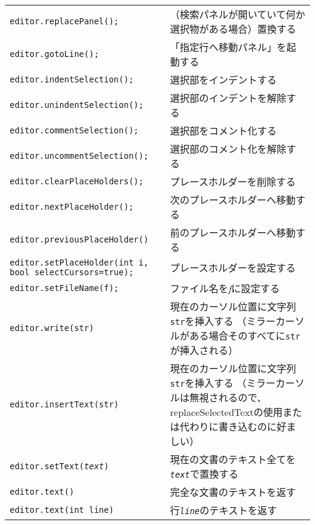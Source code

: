 \begin{longtable}{XX}
  \texttt{editor.replacePanel();} & （検索パネルが開いていて何か選択物がある場合）置換する\\
  \texttt{editor.gotoLine();} & 「指定行へ移動パネル」を起動する\\
  \texttt{editor.indentSelection();} & 選択部をインデントする\\
  \texttt{editor.unindentSelection();} & 選択部のインデントを解除する\\
  \texttt{editor.commentSelection();} & 選択部をコメント化する\\
  \texttt{editor.uncommentSelection();} & 選択部のコメント化を解除する\\
  \texttt{editor.clearPlaceHolders();} & プレースホルダーを削除する\\
  \texttt{editor.nextPlaceHolder();} & 次のプレースホルダーへ移動する\\
  \texttt{editor.previousPlaceHolder()} & 前のプレースホルダーへ移動する\\
  \texttt{editor.setPlaceHolder(int i, bool selectCursors=true);}
    & プレースホルダーを設定する\\
  \texttt{editor.setFileName(f);} & ファイル名を\emph{f}に設定する\\
  \texttt{editor.write(str)}
    & 現在のカーソル位置に文字列\texttt{str}を挿入する
    （ミラーカーソルがある場合そのすべてに\texttt{str}が挿入される）\\
  \texttt{editor.insertText(str)}
    & 現在のカーソル位置に文字列\texttt{str}を挿入する
    （ミラーカーソルは無視されるので、replaceSelectedTextの使用または代わりに書き込むのに好ましい）\\
  \texttt{editor.setText(\emph{text})}
    & 現在の文書のテキスト全てを\texttt{\emph{text}}で置換する\\
  \texttt{editor.text()} & 完全な文書のテキストを返す\\
  \texttt{editor.text(int line)} & 行\texttt{\emph{line}}のテキストを返す\\
  \hline
\end{longtable}
